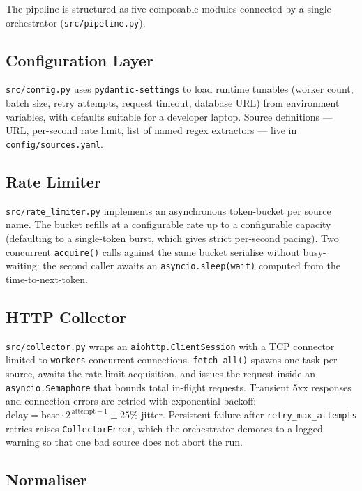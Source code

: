 \documentclass[conference]{IEEEtran}
\begin{document}
The pipeline is structured as five composable modules connected by
a single orchestrator (\texttt{src/pipeline.py}).

\subsection{Configuration Layer}

\texttt{src/config.py} uses \texttt{pydantic-settings} to load
runtime tunables (worker count, batch size, retry attempts, request
timeout, database URL) from environment variables, with defaults
suitable for a developer laptop. Source definitions --- URL,
per-second rate limit, list of named regex extractors --- live in
\texttt{config/sources.yaml}.

\subsection{Rate Limiter}

\texttt{src/rate\_limiter.py} implements an asynchronous
token-bucket per source name. The bucket refills at a configurable
rate up to a configurable capacity (defaulting to a single-token
burst, which gives strict per-second pacing). Two concurrent
\texttt{acquire()} calls against the same bucket serialise without
busy-waiting: the second caller awaits an
\texttt{asyncio.sleep(wait)} computed from the time-to-next-token.

\subsection{HTTP Collector}

\texttt{src/collector.py} wraps an
\texttt{aiohttp.ClientSession} with a TCP connector limited to
\texttt{workers} concurrent connections. \texttt{fetch\_all()}
spawns one task per source, awaits the rate-limit acquisition, and
issues the request inside an \texttt{asyncio.Semaphore} that bounds
total in-flight requests. Transient 5xx responses and connection
errors are retried with exponential backoff: $\mathrm{delay} =
\mathrm{base} \cdot 2^{\,\mathrm{attempt}-1} \pm 25\%$ jitter.
Persistent failure after \texttt{retry\_max\_attempts} retries
raises \texttt{CollectorError}, which the orchestrator demotes to
a logged warning so that one bad source does not abort the run.

\subsection{Normaliser}
\end{document}
